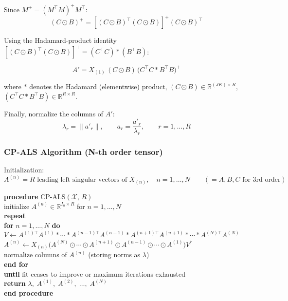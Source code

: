 \documentclass[12pt]{article}
\newcommand{\T}[1]{\mathcal{#1}}   %
\begin{document}
Since $M^{+} = (M^{\top} M)^{+} M^{\top}$:
\begin{equation}
(C \odot B)^{+}
= \left[(C \odot B)^{\top}(C \odot B)\right]^{+}(C \odot B)^{\top}
\end{equation}

Using the Hadamard-product identity
$\left[(C \odot B)^{\top}(C \odot B)\right]^{+} = (C^{\top}C) * (B^{\top}B)$:

\begin{equation}
\boxed{
A' = X_{(1)}\,(C \odot B)\,\bigl(C^{\top}C \ast B^{\top}B\bigr)^{+}
}
\end{equation}

\noindent where $\ast$ denotes the Hadamard (elementwise) product,
$(C \odot B) \in \mathbb{R}^{(JK)\times R}$,
$(C^{\top}C \ast B^{\top}B) \in \mathbb{R}^{R \times R}$.

\medskip
\noindent Finally, normalize the columns of $A'$:
\begin{equation}
\lambda_r = \|a'_r\|, \qquad a_r = \frac{a'_r}{\lambda_r},
\qquad r = 1, \ldots, R
\end{equation}

\subsubsection*{CP-ALS Algorithm (N-th order tensor)}

Initialization:
\begin{equation}
A^{(n)} = R\text{ leading left singular vectors of }X_{(n)},
\quad n = 1, \ldots, N
\qquad (= A, B, C \text{ for 3rd order})
\end{equation}

\bigskip
\begin{center}
\begin{minipage}{0.92\linewidth}
\renewcommand{\baselinestretch}{1.4}\selectfont
\textbf{procedure} CP-ALS$(\T{X},\, R)$\\
\quad initialize $A^{(n)} \in \mathbb{R}^{I_n \times R}$ \;for $n = 1, \ldots, N$\\
\quad \textbf{repeat}\\
\qquad \textbf{for} $n = 1, \ldots, N$ \textbf{do}\\[2pt]
\qquad\quad
$V \leftarrow
A^{(1)\top}A^{(1)} \ast \cdots \ast A^{(n-1)\top}A^{(n-1)}
\ast A^{(n+1)\top}A^{(n+1)} \ast \cdots \ast A^{(N)\top}A^{(N)}$\\[2pt]
\qquad\quad
$A^{(n)} \leftarrow
X_{(n)}\!\bigl(A^{(N)} \odot \cdots \odot A^{(n+1)}
              \odot A^{(n-1)} \odot \cdots \odot A^{(1)}\bigr)
V^{\dagger}$\\[2pt]
\qquad\quad normalize columns of $A^{(n)}$ (storing norms as $\lambda$)\\
\qquad \textbf{end for}\\
\quad \textbf{until} fit ceases to improve or maximum iterations exhausted\\
\quad \textbf{return} $\lambda,\; A^{(1)},\; A^{(2)},\; \ldots,\; A^{(N)}$\\
\textbf{end procedure}
\end{minipage}
\end{center}
\end{document}
